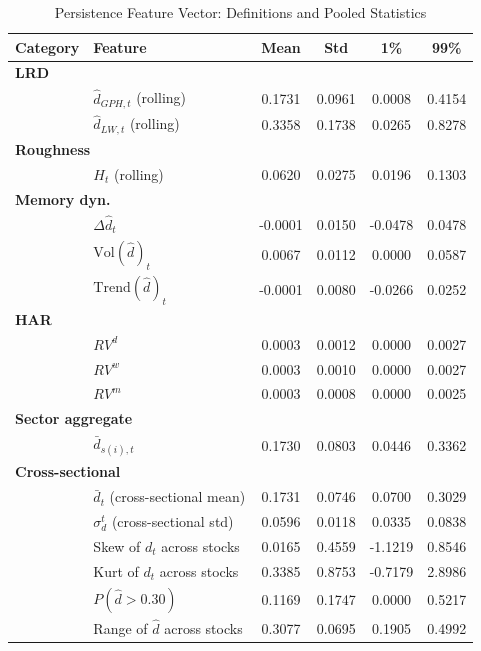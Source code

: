 
\begin{table}[htbp]
\centering
\caption{Persistence Feature Vector: Definitions and Pooled Statistics}
\label{tab:features}
\small
\begin{tabular}{llcccc}
\toprule
Category & Feature & Mean & Std & 1\% & 99\% \\
\midrule
\multicolumn{6}{l}{\textbf{LRD}} \\
  & $\hat d_{GPH,t}$ (rolling) & 0.1731 & 0.0961 & 0.0008 & 0.4154 \\
  & $\hat d_{LW,t}$ (rolling) & 0.3358 & 0.1738 & 0.0265 & 0.8278 \\
\midrule
\multicolumn{6}{l}{\textbf{Roughness}} \\
  & $H_t$ (rolling) & 0.0620 & 0.0275 & 0.0196 & 0.1303 \\
\midrule
\multicolumn{6}{l}{\textbf{Memory dyn.}} \\
  & $\Delta\hat d_t$ & -0.0001 & 0.0150 & -0.0478 & 0.0478 \\
  & $\mathrm{Vol}(\hat d)_t$ & 0.0067 & 0.0112 & 0.0000 & 0.0587 \\
  & $\mathrm{Trend}(\hat d)_t$ & -0.0001 & 0.0080 & -0.0266 & 0.0252 \\
\midrule
\multicolumn{6}{l}{\textbf{HAR}} \\
  & $RV^d$ & 0.0003 & 0.0012 & 0.0000 & 0.0027 \\
  & $RV^w$ & 0.0003 & 0.0010 & 0.0000 & 0.0027 \\
  & $RV^m$ & 0.0003 & 0.0008 & 0.0000 & 0.0025 \\
\midrule
\multicolumn{6}{l}{\textbf{Sector aggregate}} \\
  & $\bar d_{s(i),t}$ & 0.1730 & 0.0803 & 0.0446 & 0.3362 \\
\midrule
\multicolumn{6}{l}{\textbf{Cross-sectional}} \\
  & $\bar d_t$ (cross-sectional mean) & 0.1731 & 0.0746 & 0.0700 & 0.3029 \\
  & $\sigma_d^t$ (cross-sectional std) & 0.0596 & 0.0118 & 0.0335 & 0.0838 \\
  & Skew of $d_t$ across stocks & 0.0165 & 0.4559 & -1.1219 & 0.8546 \\
  & Kurt of $d_t$ across stocks & 0.3385 & 0.8753 & -0.7179 & 2.8986 \\
  & $P(\hat d > 0.30)$ & 0.1169 & 0.1747 & 0.0000 & 0.5217 \\
  & Range of $\hat d$ across stocks & 0.3077 & 0.0695 & 0.1905 & 0.4992 \\

\end{tabular}
\end{table}
